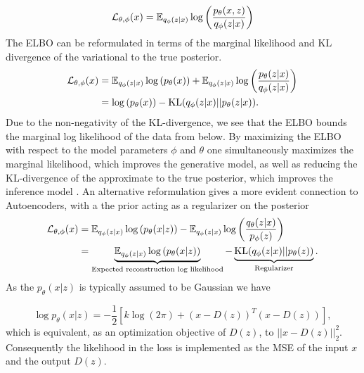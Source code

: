 \documentclass[../../thesis.tex]{subfiles}
\begin{document}
\begin{equation}
    \label{eq:ELBO}
    \mathcal{L}_{\theta,\phi}(x) 
    = \mathbb{E}_{q_\phi(z|x)} \log \left( \frac{p_\theta(x,z)}{q_\phi(z|x)}\right)
\end{equation}
The ELBO can be reformulated in terms of the marginal likelihood and KL divergence of the variational to the true posterior.
\begin{equation}
    \begin{aligned}
        \label{eq:ELBO_loglik}
        \mathcal{L}_{\theta,\phi}(x) 
        &=  \mathbb{E}_{q_\phi(z|x)} \log \left( p_\theta(x)\right) + \mathbb{E}_{q_\phi(z|x)} \log \left( \frac{p_\theta(z|x)}{q_\phi(z|x)}\right) \\
        &= \log \left( p_\theta(x)\right) - \textrm{KL}(q_\phi(z|x)|| p_\theta(z|x)).
    \end{aligned}
\end{equation}
Due to the non-negativity of the KL-divergence, we see that the ELBO bounds the marginal log likelihood of the data from below. By maximizing the ELBO with respect to the model parameters $\phi$ and $\theta$ one simultaneously maximizes the marginal likelihood, which improves the generative model, as well as reducing the KL-divergence of the approximate to the true posterior, which improves the inference model \cite{VAE}.\newline
An alternative reformulation gives a more evident connection to Autoencoders, with a the prior acting as a regularizer on the posterior 
\begin{equation}
    \begin{aligned}
        \label{eq:ELBO_AE}
        \mathcal{L}_{\theta,\phi}(x) 
        &=  \mathbb{E}_{q_\phi(z|x)} \log \left( p_\theta(x|z)\right) - \mathbb{E}_{q_\phi(z|x)} \log \left( \frac{q_\theta(z|x)}{p_\phi(z)}\right) \\
        &= \underbrace{\mathbb{E}_{q_\phi(z|x)} \log \left( p_\theta(x|z)\right)}_{\text{Expected reconstruction log likelihood}} - \underbrace{\textrm{KL}(q_\phi(z|x)|| p_\theta(z))}_{\text{Regularizer}}.
    \end{aligned}
\end{equation}
As the $p_\theta(x|z)$ is typically assumed to be Gaussian we have

\begin{equation}
    \log p_\theta(x|z) = -\frac12 \left[k\log(2\pi)+ (x-D(z))^T(x-D(z))\right],
\end{equation}
which is equivalent, as an optimization objective of $D(z)$, to $||x-D(z)||_2^2$. Consequently the likelihood in the loss is implemented as the MSE of the input $x$ and the output $D(z)$.
\end{document}
